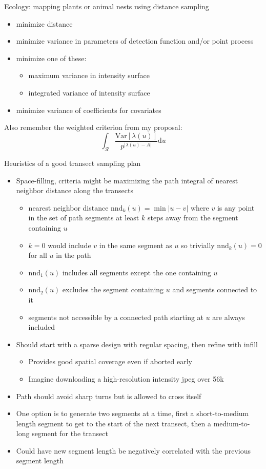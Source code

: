 \documentclass[12pt]{article}
\begin{document}
Ecology: mapping plants or animal nests using distance sampling
\begin{itemize}
\item minimize distance
\item minimize variance in parameters of detection function and/or point process
\item minimize one of these:
\begin{itemize}
\item maximum variance in intensity surface
\item integrated variance of intensity surface
\end{itemize}
\item minimize variance of coefficients for covariates
\end{itemize}

Also remember the weighted criterion from my proposal:
\begin{equation*}
\int_{\mathcal{R}} \frac{\mathrm{Var}\left[\lambda(u)\right]}
{p^{\left|\lambda(u)-A\right|}} \mathrm{d}u
\end{equation*}

Heuristics of a good transect sampling plan
\begin{itemize}
\item Space-filling, criteria might be maximizing the path integral of nearest
neighbor distance along the transects
\begin{itemize}
\item nearest neighbor distance \(\mathrm{nnd}_{k}(u) = \min|u - v|\) where
\(v\) is any point in the set of path segments at least \(k\) steps away from
the segment containing \(u\)
\item \(k = 0\) would include \(v\) in the same segment as \(u\) so trivially
\(\mathrm{nnd}_{k}(u) = 0\) for all \(u\) in the path
\item \(\mathrm{nnd}_{1}(u)\) includes all segments except the one containing \(u\)
\item \(\mathrm{nnd}_{2}(u)\) excludes the segment containing \(u\) and segments
connected to it
\item segments not accessible by a connected path starting at \(u\) are always
included
\end{itemize}
\item Should start with a sparse design with regular spacing, then refine with
infill
\begin{itemize}
\item Provides good spatial coverage even if aborted early
\item Imagine downloading a high-resolution intensity jpeg over 56k
\end{itemize}
\item Path should avoid sharp turns but is allowed to cross itself
\item One option is to generate two segments at a time, first a short-to-medium
length segment to get to the start of the next transect, then a  medium-to-long
segment for the transect
\item Could have new segment length be negatively correlated with the previous
segment length
\end{itemize}
\end{document}
